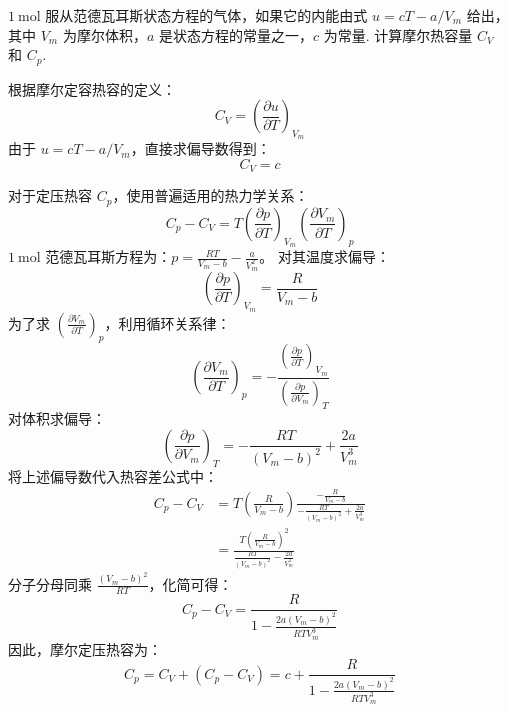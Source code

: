\begin{exercise}\label{ex:14.1}
$1 \ \mathrm{mol}$ 服从范德瓦耳斯状态方程的气体，如果它的内能由式 $u = cT - a/V_m$ 给出，其中 $V_m$ 为摩尔体积，$a$ 是状态方程的常量之一，$c$ 为常量. 计算摩尔热容量 $C_V$ 和 $C_p$.
\end{exercise}
\begin{solution}
根据摩尔定容热容的定义：
$$ C_V = \left( \frac{\partial u}{\partial T} \right)_{V_m} $$
由于 $u = cT - a/V_m$，直接求偏导数得到：
$$ C_V = c $$

对于定压热容 $C_p$，使用普遍适用的热力学关系：
$$ C_p - C_V = T \left( \frac{\partial p}{\partial T} \right)_{V_m} \left( \frac{\partial V_m}{\partial T} \right)_p $$
$1 \ \mathrm{mol}$ 范德瓦耳斯方程为：$p = \frac{RT}{V_m - b} - \frac{a}{V_m^2}$。
对其温度求偏导：
$$ \left( \frac{\partial p}{\partial T} \right)_{V_m} = \frac{R}{V_m - b} $$
为了求 $\left( \frac{\partial V_m}{\partial T} \right)_p$，利用循环关系律：
$$ \left( \frac{\partial V_m}{\partial T} \right)_p = - \frac{\left( \frac{\partial p}{\partial T} \right)_{V_m}}{\left( \frac{\partial p}{\partial V_m} \right)_T} $$
对体积求偏导：
$$ \left( \frac{\partial p}{\partial V_m} \right)_T = - \frac{RT}{(V_m - b)^2} + \frac{2a}{V_m^3} $$
将上述偏导数代入热容差公式中：
\begin{align*}
    C_p - C_V &= T \left( \frac{R}{V_m - b} \right) \frac{-\frac{R}{V_m - b}}{- \frac{RT}{(V_m - b)^2} + \frac{2a}{V_m^3}} \\
    &= \frac{T \left( \frac{R}{V_m - b} \right)^2}{\frac{RT}{(V_m - b)^2} - \frac{2a}{V_m^3}}
\end{align*}
分子分母同乘 $\frac{(V_m - b)^2}{RT}$，化简可得：
$$ C_p - C_V = \frac{R}{1 - \frac{2a(V_m - b)^2}{RTV_m^3}} $$
因此，摩尔定压热容为：
$$ C_p = C_V + (C_p - C_V) = c + \frac{R}{1 - \frac{2a(V_m - b)^2}{RTV_m^3}} $$
\end{solution}

